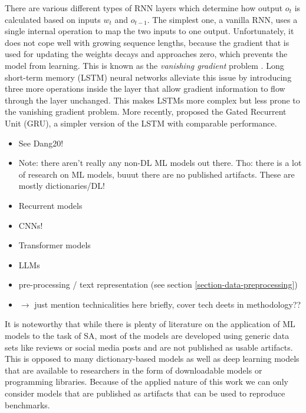 

There are various different types of RNN layers which determine how output $o_t$ is calculated based on inputs $w_t$ and $o_{t-1}$. The simplest one, a vanilla RNN, uses a single internal operation to map the two inputs to one output. Unfortunately, it does not cope well with growing sequence lengths, because the gradient that is used for updating the weights decays and approaches zero, which prevents the model from learning. This is known as the \emph{vanishing gradient} problem . Long short-term memory (LSTM) neural networks  alleviate this issue by introducing three more operations inside the layer that allow gradient information to flow through the layer unchanged. This makes LSTMs more complex but less prone to the vanishing gradient problem. More recently,  proposed the Gated Recurrent Unit (GRU), a simpler version of the LSTM with comparable performance.


\begin{itemize}[noitemsep]
	\item See Dang20!
	\item Note: there aren't really any non-DL ML models out there. Tho: there is a lot of research on ML models, buuut there are no published artifacts. These are mostly dictionaries/DL!
	\item Recurrent models
	\item CNNs!
	\item Transformer models
	\item LLMs
	\item pre-processing / text representation (see section \ref{section-data-preprocessing})
	\item $\rightarrow$ just mention technicalities here briefly, cover tech deets in methodology??
\end{itemize}

It is noteworthy that while there is plenty of literature on the application of ML models to the task of SA, most of the models are developed using generic data sets like reviews or social media posts and are not published as usable artifacts. This is opposed to many dictionary-based models as well as deep learning models that are available to researchers in the form of downloadable models or programming libraries. Because of the applied nature of this work we can only consider models that are published as artifacts that can be used to reproduce benchmarks.


